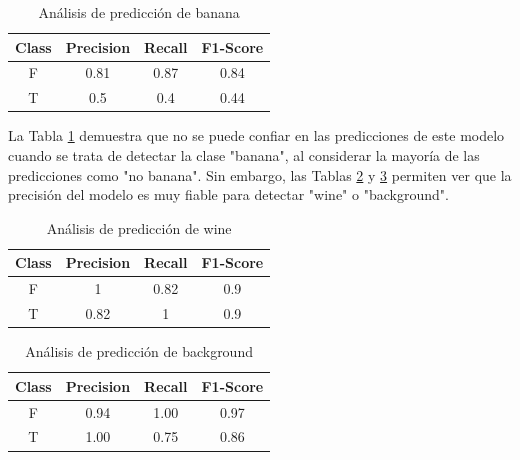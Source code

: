 \documentclass{esannV2}
\begin{document}
\begin{table}[!]
  \centering
  \begin{tabular}{|c|c|c|c|}
    \hline
    Class & Precision & Recall & F1-Score \\
    \hline
    F & 0.81 & 0.87 & 0.84 \\ \hline
    T & 0.5 & 0.4 & 0.44 \\  
    \hline
  \end{tabular}
  \caption{Análisis de predicción de banana}\label{tab:banana}
\end{table}

La Tabla \ref{tab:banana} demuestra que no se puede confiar en las predicciones de este modelo cuando se trata de detectar la clase "banana", al considerar la mayoría de las predicciones como "no banana". Sin embargo, las Tablas \ref{tab:wine} y \ref{tab:background} permiten ver que la precisión del modelo es muy fiable para detectar "wine" o "background".

\begin{table}[!]
  \centering
  \begin{tabular}{|c|c|c|c|}
    \hline
    Class & Precision & Recall & F1-Score \\
    \hline
    F & 1 & 0.82 & 0.9 \\ \hline
    T & 0.82 & 1 & 0.9 \\  
    \hline
  \end{tabular}
  \caption{Análisis de predicción de wine}\label{tab:wine}
\end{table}


\begin{table}[!]
  \centering
  \begin{tabular}{|c|c|c|c|}
    \hline
    Class & Precision & Recall & F1-Score \\
    \hline
    F & 0.94 & 1.00 & 0.97 \\ \hline
    T & 1.00 & 0.75 & 0.86 \\  
    \hline
  \end{tabular}
  \caption{Análisis de predicción de background}\label{tab:background}
\end{table}
\end{document}

